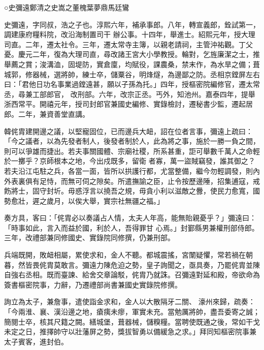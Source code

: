 
\begin{pinyinscope}

 ○史彌遠鄭清之史嵩之董槐葉夢鼎馬廷鸞



 史彌遠，字同叔，浩之子也。淳熙六年，補承事郎。八年，轉宣義郎，銓試第一，調建康府糧料院，改沿海制置司干
 辦公事。十四年，舉進士。紹熙元年，授大理司直。二年，遷太社令。三年，遷太常寺主簿，以親老請祠，主管沖祐觀。丁父憂。慶元二年，復為大理司直，尋改諸王宮大小學教授。輪對，乞旌廉潔之士，推舉薦之賞；浚溝洫，固堤防，實倉廩，均賦役，課農桑，禁末作，為水旱之備；葺城郭，修器械，選將帥，練士卒，儲粟谷，明烽燧，為邊鄙之防。丞相京鏜屏左右曰：「君他日功名事業過鏜遠甚，願以子孫為托。」四年，授樞密院編修官，遷太常丞，尋兼工部郎官，
 改刑部。六年，改宗正丞。丐外，知池州。嘉泰四年，提舉浙西常平。開禧元年，授司封郎官兼國史編修、實錄檢討，遷秘書少監，遷起居郎。二年，兼資善堂直講。



 韓侂胄建開邊之議，以堅寵固位，已而邊兵大衄，詔在位者言事，彌遠上疏曰：「今之議者，以為先發者制人，後發者制於人，此為將之事，施於一勝一負之間，則可以爭雄而捷出。若夫事關國體、宗廟社稷，所系甚重，詎可舉數千萬人之命輕於一擲乎？京師根本之地，今出戍既多，留衛
 者寡，萬一盜賊竊發，誰其御之？若夫沿江屯駐之兵，各當一面，皆所以拱護行都，尤當整備，繼今勿輕調發，則內外表裏俱有足恃，而無可伺之隙矣。所遣撫諭之臣，止令按歷邊陲，招集逋寇，戒飭將士，固守封圻。毋惑浮言以撓吾之規，毋貪小利以滋敵之釁，使民力愈寬，國勢愈壯，遲之歲月，以俟大舉，實宗社無疆之福。」



 奏方具，客曰：「侂胄必以奏議占人情，太夫人年高，能無貽親憂乎？」彌遠曰：「時事如此，言入而益於國，利於人，吾得罪甘
 心焉。」封鄞縣男兼權刑部侍郎。三年，改禮部兼同修國史、實錄院同修撰，仍兼刑部。



 兵端既開，敗衄相屬，累使求和，金人不聽。都城震搖，宮闈疑懼，常若禍在朝暮，然皆畏侂胄莫敢言。彌遠力陳危迫之勢，皇子詢聞之，亟具奏，乃罷侂胄並陳自強右丞相。既而臺諫、給舍交章論駁，侂胄乃就誅。召彌遠對延和殿，帝欲命為簽書樞密院事，力辭，乃遷禮部尚書兼國史實錄院修撰。



 詢立為太子，兼詹事，遣使詣金求和，金人以大散隔牙二關、
 濠州來歸，疏奏：「今兩淮、襄、漢沿邊之地，瘡痍未瘳，軍實未充。當勉厲將帥，盡吾委寄之誠；簡閱士卒，核其尺籍之闕。繕城堡，葺器械，儲糗糧。當聘使既通之後，常如干戈未定之日，推擇帥守以壯藩屏之勢，獎拔智勇以備緩急之求。」拜同知樞密院事兼太子賓客，進封伯。




\end{pinyinscope}
